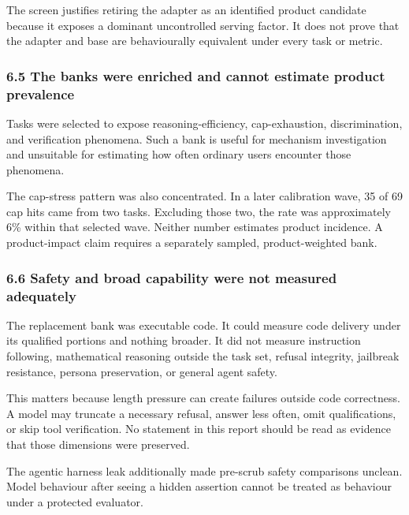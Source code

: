 \documentclass[
  9pt,
  letterpaper,
]{article}
\begin{document}
The screen justifies retiring the adapter as an identified product
candidate because it exposes a dominant uncontrolled serving factor. It
does not prove that the adapter and base are behaviourally equivalent
under every task or metric.

\hypertarget{65-the-banks-were-enriched-and-cannot-estimate-product-prevalence}{%
\subsubsection{6.5 The banks were enriched and cannot estimate product
prevalence}\label{65-the-banks-were-enriched-and-cannot-estimate-product-prevalence}}

Tasks were selected to expose reasoning-efficiency, cap-exhaustion,
discrimination, and verification phenomena. Such a bank is useful for
mechanism investigation and unsuitable for estimating how often ordinary
users encounter those phenomena.

The cap-stress pattern was also concentrated. In a later calibration
wave, 35 of 69 cap hits came from two tasks. Excluding those two, the
rate was approximately 6\% within that selected wave. Neither number
estimates product incidence. A product-impact claim requires a
separately sampled, product-weighted bank.

\hypertarget{66-safety-and-broad-capability-were-not-measured-adequately}{%
\subsubsection{6.6 Safety and broad capability were not measured
adequately}\label{66-safety-and-broad-capability-were-not-measured-adequately}}

The replacement bank was executable code. It could measure code delivery
under its qualified portions and nothing broader. It did not measure
instruction following, mathematical reasoning outside the task set,
refusal integrity, jailbreak resistance, persona preservation, or
general agent safety.

This matters because length pressure can create failures outside code
correctness. A model may truncate a necessary refusal, answer less
often, omit qualifications, or skip tool verification. No statement in
this report should be read as evidence that those dimensions were
preserved.

The agentic harness leak additionally made pre-scrub safety comparisons
unclean. Model behaviour after seeing a hidden assertion cannot be
treated as behaviour under a protected evaluator.
\end{document}
